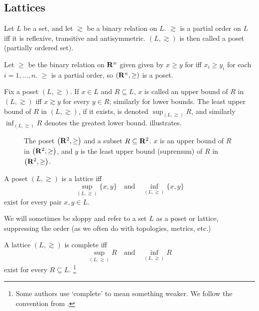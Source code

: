 \documentclass[11pt,letterpaper,reqno,oneside]{article}
\begin{document}
\subsection{Lattices}
\label{sec:supermodular:lattices}

\begin{definition}
	Let $L$ be a set, and let $\gtrsim$ be a binary relation on $L$. $\gtrsim$ is a partial order on $L$ iff it is reflexive, transitive and antisymmetric. $(L,\gtrsim)$ is then called a poset (partially ordered set).
\end{definition}

\begin{example}
	Let $\geq$ be the binary relation on $\mathbf{R}^n$ given given by $x \geq y$ for iff $x_i \geq y_i$ for each $i=1,\dots,n$. $\geq$ is a partial order, so $\left(\mathbf{R}^n,\geq\right)$ is a poset.
\end{example}

Fix a poset $(L,\gtrsim)$. If $x \in L$ and $R \subseteq L$, $x$ is called an upper bound of $R$ in $(L,\gtrsim)$ iff $x \gtrsim y$ for every $y \in R$; similarly for lower bounds. The least upper bound of $R$ in $(L,\gtrsim)$, if it exists, is denoted $\sup_{(L,\gtrsim)} R$, and similarly $\inf_{(L,\gtrsim)} R$ denotes the greatest lower bound.  illustrates.
%
\begin{figure}
	\centering
	
	\caption{The poset $\left(\mathbf{R}^2,\geq\right)$ and a subset $R \subseteq \mathbf{R}^2$. $x$ is an upper bound of $R$ in $\left(\mathbf{R}^2,\geq\right)$, and $y$ is the least upper bound (supremum) of $R$ in $\left(\mathbf{R}^2,\geq\right)$.}
	\label{fig:example_supremum}	
\end{figure}


\begin{definition}
	A poset $(L,\gtrsim)$ is a lattice iff
	\begin{equation*}
		\sup_{(L,\gtrsim)}\{x,y\}
		\quad\text{and}\quad
		\inf_{(L,\gtrsim)}\{x,y\}
	\end{equation*}
	exist for every pair $x,y \in L$.
\end{definition}

We will sometimes be sloppy and refer to a set $L$ as a poset or lattice, suppressing the order (as we often do with topologies, metrics, etc.)


\begin{definition}
	A lattice $(L,\gtrsim)$ is complete iff
	\begin{equation*}
		\sup_{(L,\gtrsim)} R
		\quad\text{and}\quad
		\inf_{(L,\gtrsim)} R
	\end{equation*}
	exist for every $R \subseteq L$.%
		\footnote{Some authors use `complete' to mean something weaker. We follow the convention from \textcite{Topkis1998}.}
\end{definition}
\end{document}
